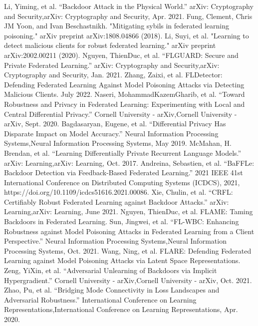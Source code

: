 \documentclass[conference]{IEEEtran}
\begin{document}
\begin{thebibliography}{00}
     Li, Yiming, et al. “Backdoor Attack in the Physical World.” arXiv: Cryptography and Security,arXiv: Cryptography and Security, Apr. 2021.
     Fung, Clement, Chris JM Yoon, and Ivan Beschastnikh. "Mitigating sybils in federated learning poisoning." arXiv preprint arXiv:1808.04866 (2018).
     Li, Suyi, et al. "Learning to detect malicious clients for robust federated learning." arXiv preprint arXiv:2002.00211 (2020).
     Nguyen, ThienDuc, et al. “FLGUARD: Secure and Private Federated Learning.” arXiv: Cryptography and Security,arXiv: Cryptography and Security, Jan. 2021.
     Zhang, Zaixi, et al. FLDetector: Defending Federated Learning Against Model Poisoning Attacks via Detecting Malicious Clients. July 2022.
     Naseri, MohammadKazemGharib, et al. “Toward Robustness and Privacy in Federated Learning: Experimenting with Local and Central Differential Privacy.” Cornell University - arXiv,Cornell University - arXiv, Sept. 2020.
     Bagdasaryan, Eugene, et al. “Differential Privacy Has Disparate Impact on Model Accuracy.” Neural Information Processing Systems,Neural Information Processing Systems, May 2019.
     McMahan, H. Brendan, et al. “Learning Differentially Private Recurrent Language Models.” arXiv: Learning,arXiv: Learning, Oct. 2017.
     Andreina, Sebastien, et al. “BaFFLe: Backdoor Detection via Feedback-Based Federated Learning.” 2021 IEEE 41st International Conference on Distributed Computing Systems (ICDCS), 2021, https://doi.org/10.1109/icdcs51616.2021.00086.
     Xie, Chulin, et al. “CRFL: Certifiably Robust Federated Learning against Backdoor Attacks.” arXiv: Learning,arXiv: Learning, June 2021.
     Nguyen, ThienDuc, et al. FLAME: Taming Backdoors in Federated Learning.
     Sun, Jingwei, et al. “FL-WBC: Enhancing Robustness against Model Poisoning Attacks in Federated Learning from a Client Perspective.” Neural Information Processing Systems,Neural Information Processing Systems, Oct. 2021.
     Wang, Ning, et al. FLARE: Defending Federated Learning against Model Poisoning Attacks via Latent Space Representations.
     Zeng, YiXin, et al. “Adversarial Unlearning of Backdoors via Implicit Hypergradient.” Cornell University - arXiv,Cornell University - arXiv, Oct. 2021.
     Zhao, Pu, et al. “Bridging Mode Connectivity in Loss Landscapes and Adversarial Robustness.” International Conference on Learning Representations,International Conference on Learning Representations, Apr. 2020.

\end{thebibliography}
\end{document}
